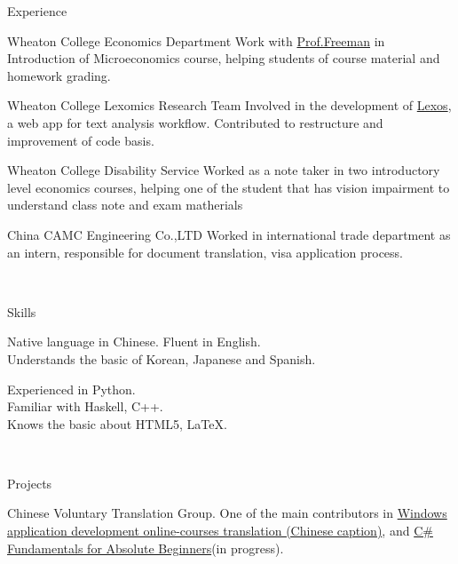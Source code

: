 \documentclass[]{resume-knyte}
\begin{document}
\begin{topic}{Experience}

    
    {Wheaton College Economics Department}
    {Work with \href{https://wheatoncollege.edu/academics/faculty-directory/james-freeman/}{Prof.Freeman}
    in Introduction of Microeconomics course, helping students of course material and homework grading.}
    
    {Wheaton College Lexomics Research Team}
    {Involved in the development of \href{https://github.com/WheatonCS/Lexos}{Lexos}, a web app for text analysis workflow.
    Contributed to restructure and improvement of code basis.}
    
    {Wheaton College Disability Service}
    {Worked as a note taker in two introductory level economics courses, 
    helping one of the student that has vision impairment to understand class note and exam matherials}
    
    {China CAMC Engineering Co.,LTD}
    {Worked in international trade department as an intern, responsible for document translation, visa application process.}

\\ %
\end{topic}


\begin{topic}{Skills}

    {Native language in Chinese. 
    Fluent in English. \\
    Understands the basic of Korean, Japanese and Spanish.}

    {Experienced in Python.\\
    Familiar with Haskell, C++.\\
    Knows the basic about HTML5, \LaTeX{}.}

    \\ %
\end{topic}

\begin{topic}{Projects}


    {Chinese Voluntary Translation Group.}
    {One of the main contributors in \href{https://channel9.msdn.com/Series/Windows-10-development-for-absolute-beginners}
    {Windows application development online-courses translation (Chinese caption)},
    and \href{https://mva.microsoft.com/en-us/training-courses/c-fundamentals-for-absolute-beginners-16169?l=p90QdGQIC_7106218949}
    {C\# Fundamentals for Absolute Beginners}(in progress).}

\end{topic}
\end{document}
